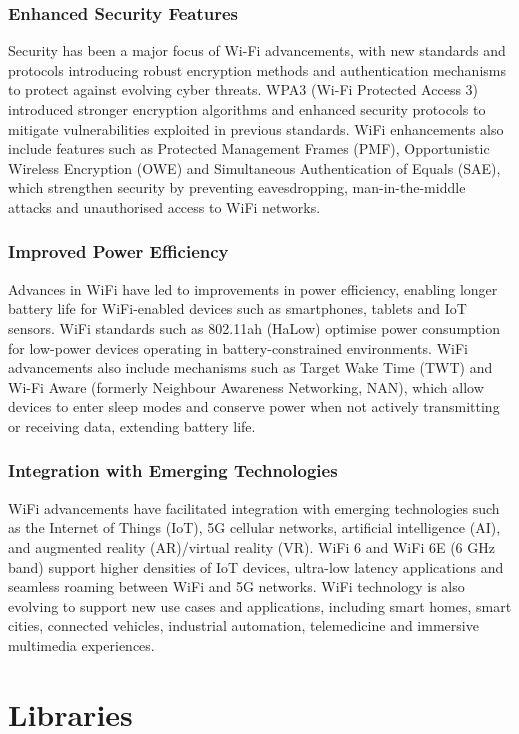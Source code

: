 \subsubsection{Enhanced Security Features}
Security has been a major focus of Wi-Fi advancements, with new standards and protocols introducing robust encryption methods and authentication mechanisms to protect against evolving cyber threats. WPA3 (Wi-Fi Protected Access 3) introduced stronger encryption algorithms and enhanced security protocols to mitigate vulnerabilities exploited in previous standards.  WiFi enhancements also include features such as Protected Management Frames (PMF), Opportunistic Wireless Encryption (OWE) and Simultaneous Authentication of Equals (SAE), which strengthen security by preventing eavesdropping, man-in-the-middle attacks and unauthorised access to WiFi networks.

\subsubsection{Improved Power Efficiency}
Advances in WiFi have led to improvements in power efficiency, enabling longer battery life for WiFi-enabled devices such as smartphones, tablets and IoT sensors. WiFi standards such as 802.11ah (HaLow) optimise power consumption for low-power devices operating in battery-constrained environments. WiFi advancements also include mechanisms such as Target Wake Time (TWT) and Wi-Fi Aware (formerly Neighbour Awareness Networking, NAN), which allow devices to enter sleep modes and conserve power when not actively transmitting or receiving data, extending battery life.

\subsubsection{Integration with Emerging Technologies}
WiFi advancements have facilitated integration with emerging technologies such as the Internet of Things (IoT), 5G cellular networks, artificial intelligence (AI), and augmented reality (AR)/virtual reality (VR). WiFi 6 and WiFi 6E (6 GHz band) support higher densities of IoT devices, ultra-low latency applications and seamless roaming between WiFi and 5G networks. WiFi technology is also evolving to support new use cases and applications, including smart homes, smart cities, connected vehicles, industrial automation, telemedicine and immersive multimedia experiences.

\section{Libraries}

